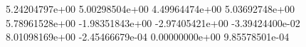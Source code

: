  5.24204797e+00
 5.00298504e+00
 4.49964474e+00
 5.03692748e+00
 5.78961528e+00
 -1.98351843e+00
 -2.97405421e+00
 -3.39424400e-02
 8.01098169e+00
 -2.45466679e-04
 0.00000000e+00
 9.85578501e-04
